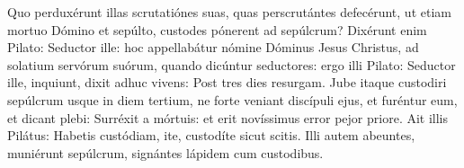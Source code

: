 
Quo perduxérunt illas scrutatiónes suas, quas perscrutántes defecérunt, ut etiam mortuo Dómino et sepúlto, custodes pónerent ad sepúlcrum? Dixérunt enim Pilato: Seductor ille: hoc appellabátur nómine Dóminus Jesus Christus, ad solatium servórum suórum, quando dicúntur seductores: ergo illi Pilato: Seductor ille, inquiunt, dixit adhuc vivens: Post tres dies resurgam. Jube itaque custodiri sepúlcrum usque in diem tertium, ne forte veniant discípuli ejus, et furéntur eum, et dicant plebi: Surréxit a mórtuis: et erit novíssimus error pejor priore. Ait illis Pilátus: Habetis custódiam, ite, custodíte sicut scitis. Illi autem abeuntes, muniérunt sepúlcrum, signántes lápidem cum custodibus.
\par